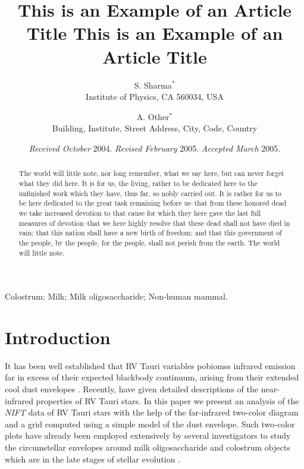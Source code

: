 \documentclass[useAMS,usenatbib]{biom}
\title[This is an Example of Recto Running Head]{This is an Example of
an Article Title This is an Example of an Article Title}
\author{S. Sharma$^{*}$\email{email@address.com} \\
	   Institute of Physics, CA 560034, USA
	   \and 
	   A. Other$^{*}$\email{email1aa@address.com}\\
	   Building, Institute, Street Address, City,
	   Code, Country
	   }
\begin{document}
\date{{\it Received October} 2004. {\it Revised February} 2005.\newline 
{\it Accepted March} 2005.}

\pagerange{\pageref{firstpage}--\pageref{lastpage}} 



\label{firstpage}


\begin{abstract}
The world will little note, nor long remember, what we say here, but
can never forget what they did here. It is for us, the living, rather
to be dedicated here to the unfinished work which they have, thus far,
so nobly carried out. It is rather for us to be here dedicated to the
great task remaining before us--that from these honored dead we take
increased devotion to that cause for which they here gave the last
full measures of devotion--that we here highly resolve that these dead
shall not have died in vain; that this nation shall have a new birth
of freedom; and that this government of the people, by the people, for
the people, shall not perish from the earth. The world will little
note.
\end{abstract}

%
%

\begin{keywords}
Colostrum; Milk; Milk oligosaccharide; Non-human mammal.
\end{keywords}

\maketitle

\section{Introduction}
\label{s:intro}

It has been well established that RV Tauri variables pobiomss infrared
emission far in excess of their expected blackbody continuum, arising
from their extended cool dust envelopes \citep{b7,b5,b6}. Recently,
\citep{b9} have given detailed descriptions of the near-infrared
properties of RV Tauri stars. In this paper we present an analysis of
the {\it NIFT\/} data of RV Tauri stars with the help of the
far-infrared two-color diagram and a grid computed using a simple
model of the dust envelope. Such two-color plots have already been
employed extensively by several investigators to study the
circumstellar envelopes around milk oligosaccharide and colostrum
objects which are in the late stages of stellar evolution
\citep{b10,b25,b24,b23}.
\end{document}
